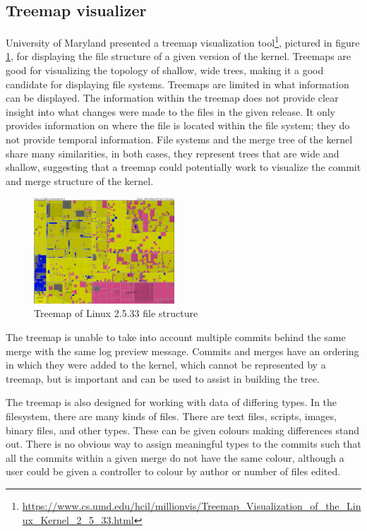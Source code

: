 \documentclass[conference, draftclsnofoot, draft]{IEEEtran}
\begin{document}

\subsection{Treemap visualizer}

University of Maryland presented a treemap visualization
tool\footnote{\url{https://www.cs.umd.edu/hcil/millionvis/Treemap_Visualization_of_the_Linux_Kernel_2_5_33.html}},
pictured in figure \ref{fig:treemap}, for displaying the file structure of a given
version of the kernel. Treemaps are good for visualizing the topology of shallow,
wide trees, making it a good candidate for displaying file systems. Treemaps are
limited in what information can be displayed. The information within the treemap
does not provide clear insight into what changes were made to the files in the given
release. It only provides information on where the file is located within the file
system; they do not provide temporal information. File systems and the merge
tree of the kernel share many similarities, in both cases, they represent trees that
are wide and shallow, suggesting that a treemap could potentially work to visualize
the commit and merge structure of the kernel.

\begin{figure}
        \centering
        \includegraphics[width=0.47\textwidth]{figures/kernel-files.png}
        \caption{Treemap of Linux 2.5.33 file structure}
        \label{fig:treemap}
\end{figure}

The treemap is unable to take into account multiple commits behind the same merge
with the same log preview message. Commits and merges have an ordering in which they
were added to the kernel, which cannot be represented by a treemap, but is important
and can be used to assist in building the tree.

The treemap is also designed for working with data of differing types. In the
filesystem, there are many kinds of files. There are text files, scripts, images,
binary files, and other types. These can be given colours making differences stand
out. There is no obvious way to assign meaningful types to the commits such that all
the commits within a given merge do not have the same colour, although a user
could be given a controller to colour by author or number of files edited.
\end{document}
